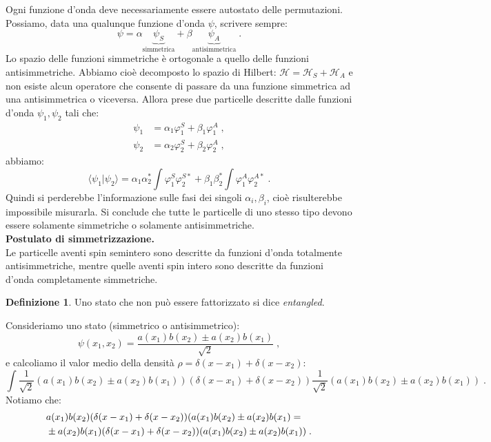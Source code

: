 \documentclass[12pt,a4paper]{report}
\theoremstyle{definition}
\newtheorem{dfn}{Definizione}[section]
\newcommand{\ham}{\mathcal{H}}
\numberwithin{equation}{section}
\newcommand{\bra}{\langle}
\newcommand{\ket}{\rangle}
\begin{document}
Ogni funzione d'onda deve necessariamente essere autostato delle permutazioni.\\
Possiamo, data una qualunque funzione d'onda $\psi$, scrivere sempre:
\begin{equation}
\psi=\alpha\underbrace{\psi_S}_{\mbox{simmetrica}}+\beta\underbrace{\psi_A}_{\mbox{antisimmetrica}}\;.
\end{equation}
Lo spazio delle funzioni simmetriche è ortogonale a quello delle funzioni antisimmetriche. Abbiamo cioè decomposto lo spazio di Hilbert: $\ham=\ham_S+\ham_A$ e non esiste alcun operatore che consente di passare da una funzione simmetrica ad una antisimmetrica o viceversa. Allora prese due particelle descritte dalle funzioni d'onda $\psi_1,\psi_2$ tali che:
\begin{align*}
\psi_1 &= \alpha_1\varphi_1^S+\beta_1\varphi_1^A\;, \\
\psi_2 &= \alpha_2\varphi_2^S+\beta_2\varphi_2^A\;,
\end{align*}
abbiamo:
\begin{equation}
\bra\psi_1|\psi_2\ket=\alpha_1\alpha_2^*\int\varphi_1^S\varphi_2^{S*}+\beta_1\beta_2^*\int\varphi_1^A\varphi_2^{A*}\;.
\end{equation}
Quindi si perderebbe l'informazione sulle fasi dei singoli $\alpha_i,\beta_i$, cioè risulterebbe impossibile misurarla. Si conclude che tutte le particelle di uno stesso tipo devono essere solamente simmetriche o solamente antisimmetriche. \\
\textbf{Postulato di simmetrizzazione.} \\
Le particelle aventi spin semintero sono descritte da funzioni d'onda totalmente antisimmetriche, mentre quelle aventi spin intero sono descritte da funzioni d'onda completamente simmetriche.
\begin{dfn} Uno stato che non può essere fattorizzato si dice \textit{entangled}.
\end{dfn}
Consideriamo uno stato (simmetrico o antisimmetrico):
\begin{equation}
\psi(x_1,x_2)=\frac{a(x_1)b(x_2)\pm a(x_2)b(x_1)}{\sqrt{2}}\;,
\end{equation}
e calcoliamo il valor medio della densità $\rho=\delta(x-x_1)+\delta(x-x_2)$:
\begin{equation}
\int \frac{1}{\sqrt{2}}(a(x_1)b(x_2)\pm a(x_2)b(x_1))(\delta(x-x_1)+\delta(x-x_2))\frac{1}{\sqrt{2}}(a(x_1)b(x_2)\pm a(x_2)b(x_1))\;.
\end{equation}
Notiamo che:
\begin{align}
&a(x_1)b(x_2)(\delta(x-x_1)+\delta(x-x_2))(a(x_1)b(x_2)\pm a(x_2)b(x_1)= \\ \notag
&\pm a(x_2)b(x_1)(\delta(x-x_1)+\delta(x-x_2))(a(x_1)b(x_2)\pm a(x_2)b(x_1))\;.
\end{align}
\end{document}

